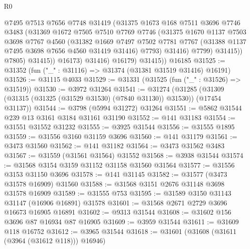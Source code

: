 \begin{lexlean}{R0}
\begin{coremodule}
                      @7495
                      @7513
                      @7656
                      @7748
                      @31419
                      (@31375
                        @1673
                        @168
                        @7511
                        @3696
                        @7746
                        @3483
                        (@31369
                          @1672
                          @7505
                          @7510
                          @7769
                          @7746
                          (@31375
                            @1670
                            @1137
                            @7503
                            @3698
                            @7767
                            @4560
                            (@31382
                              @1669
                              @7497
                              @7502
                              @7781
                              @7767
                              (@31388 @1137 @7495 @3698 @7656 @4560 @31419 @31416)
                              @7793)
                            @31416)
                          @7799)
                        @31415))
                    @7805)
                  @31415))
              @16173)
            @31416)
          @16179)
        @31415))
    @16185
@31525 := @31352 (fun ("_" : @31116) => @31374 (@31381 @31519 @31416) @16191)
@31526 := @31115 @4033
@31529 := @31331 (@31525 (fun ("_" : @31526) => @31519))
@31530 := @3972 @31264
@31541 := @31274
    (@31285 (@31309 (@31315 (@31325 (@31529 @31530) (@7840 @31130)) @31530)) (@17454 @31137))
@31544 := @3798 (@5994 @31272) @31264
@31551 := @5862 @31544 @239 @13 @3161 @3184 @31161 @31190
@31552 := @141 @31183
@31554 := @31551 @31552 @31232
@31555 := @3925 @31544
@31556 := @31555 @1895
@31559 := @31556 @3160 @31159 @3696
@31560 := @141 @31179
@31561 := @3473 @31560
@31562 := @141 @31182
@31564 := @3473 @31562 @3483
@31567 := @31559 (@31561 @31564) @31552
@31568 := @3938 @31544
@31574 := @31568 @3154 @3159 @31152 @31158 @31560 @31564
@31577 := @31556 @3153 @31150 @3696
@31578 := @141 @31145
@31582 := @31577 (@3473 @31578 @16909) @31560
@31588 := @31568 @3151 @2676 @31148 @3698 @31578 @16909
@31589 := @31555 @753
@31595 := @31589 @3150 @31143 @31147 (@16906 @16891) @31578
@31601 := @31568 @2671 @2729 @3696 @16673 @16905 @16891
@31602 := @9313 @31544
@31608 := @31602 @156 @3696 @87 @16934 @87 @16905
@31609 := @3959 @31544
@31611 := @31609 @118 @16752
@31612 := @3965 @31544
@31618 := @31601 (@31608 (@31611 (@3964 (@31612 @118))) @16946)

\end{coremodule}
\end{lexlean}
